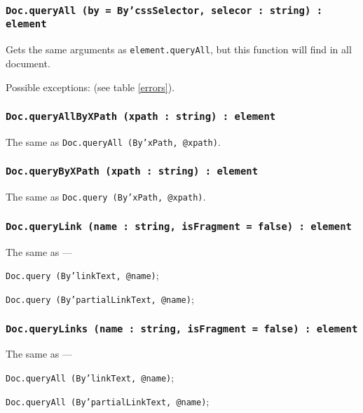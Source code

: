 \subsubsection{\texttt{Doc.queryAll (by = By'cssSelector, selecor : string) : element}}

Gets the same arguments as \texttt{element.queryAll}, but this function will find in all document.

Possible exceptions:  (see table \ref{errors}).

\subsubsection{\texttt{Doc.queryAllByXPath (xpath : string) : element}}

The same as \texttt{Doc.queryAll (By'xPath, @xpath)}.

\subsubsection{\texttt{Doc.queryByXPath (xpath : string) : element}}

The same as \texttt{Doc.query (By'xPath, @xpath)}.

\subsubsection{\texttt{Doc.queryLink (name : string, isFragment = false) : element}}

The same as —
\begin{icItems}
	\item \texttt{Doc.query (By'linkText, @name)};
	\item \texttt{Doc.query (By'partialLinkText, @name)};
\end{icItems}

\subsubsection{\texttt{Doc.queryLinks (name : string, isFragment = false) : element}}

The same as —
\begin{icItems}
	\item \texttt{Doc.queryAll (By'linkText, @name)};
	\item \texttt{Doc.queryAll (By'partialLinkText, @name)};
\end{icItems}

